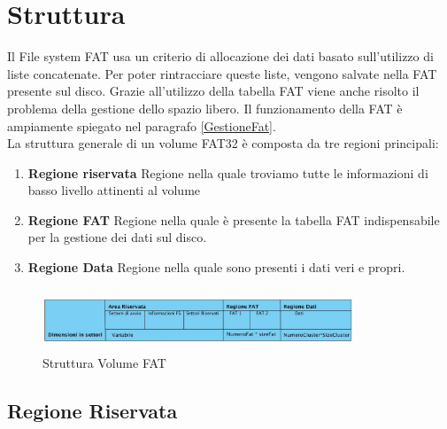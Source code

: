    \section{Struttura}
       Il File system FAT usa un criterio di allocazione dei dati basato sull'utilizzo di liste concatenate. Per poter rintracciare queste liste, vengono salvate nella FAT presente sul disco. 
	Grazie all'utilizzo della tabella FAT viene anche risolto il problema della gestione dello spazio libero. Il funzionamento della FAT è ampiamente spiegato nel paragrafo \ref{GestioneFat}.\\
      La struttura generale di un volume FAT32 è composta da tre regioni principali: 
        \begin{enumerate}
           \item  \textbf{Regione riservata} Regione nella quale troviamo tutte le informazioni di basso livello attinenti al volume
           \item  \textbf{Regione FAT}  Regione nella quale è presente la tabella FAT indispensabile per la gestione dei dati sul disco. 
           \item  \textbf{Regione Data} Regione nella quale sono presenti i dati veri e propri.
         \end{enumerate}
    
    \begin{figure}[h]
    \centering
    \includegraphics[width=350px,height=70px]{./Immagini/struttura.jpg}
    \caption{Struttura Volume FAT}
    \label{Fig.: Struttura Volume FAT32}
    \end{figure}

    \subsection{Regione Riservata}

